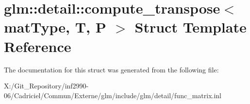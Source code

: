 \hypertarget{structglm_1_1detail_1_1compute__transpose}{\section{glm\-:\-:detail\-:\-:compute\-\_\-transpose$<$ mat\-Type, T, P $>$ Struct Template Reference}
\label{structglm_1_1detail_1_1compute__transpose}
}


The documentation for this struct was generated from the following file\-:\begin{DoxyCompactItemize}
\item 
X\-:/\-Git\-\_\-\-Repository/inf2990-\/06/\-Cadriciel/\-Commun/\-Externe/glm/include/glm/detail/func\-\_\-matrix.\-inl\end{DoxyCompactItemize}
